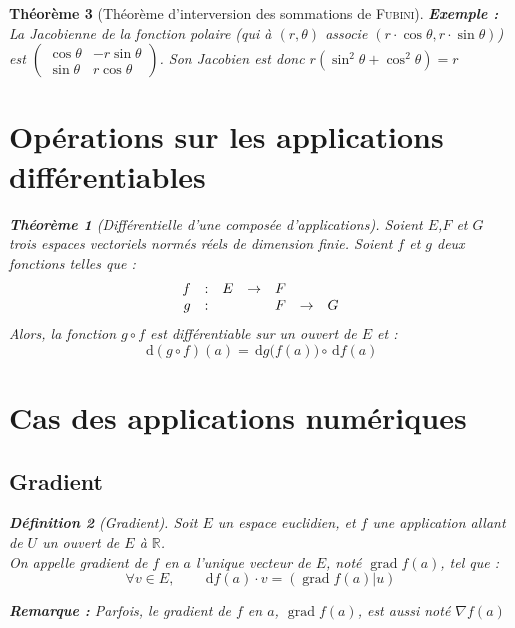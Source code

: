 \documentclass[11pt,a4paper]{report}
\newtheorem{theorem}{Théorème}[chapter]
\newtheorem{itheorem}[theorem]{Théorème}
\theoremstyle{definition}
\newtheorem{dfn}[theorem]{Définition}
\begin{document}
\begin{theorem}[Théorème d'interversion des sommations de \textsc{Fubini}]
{{\textbf{Exemple :} La Jacobienne de la fonction polaire (qui à $(r,\theta )$ associe $(r\cdot \cos{\theta} , r\cdot \sin{\theta} )$) est $\begin{pmatrix}
\cos{\theta} & -r\sin{\theta} \\
\sin{\theta} & r\cos{\theta}
\end{pmatrix}$. Son Jacobien est donc $r\left( \sin^2{\theta} + \cos^2{\theta} \right)=r$


\section{Opérations sur les applications différentiables} %
\label{sec:operations_sur_les_applications_differentiables}
\begin{itheorem}[Différentielle d'une composée d'applications]
Soient $E$,$F$ et $G$ trois espaces vectoriels \emph{normés} \emph{réels} de \emph{dimension finie}.\newline
Soient $f$ et $g$ deux fonctions telles que :
\[
    \begin{array}{r c l c l c l}
    f &:& E &\to& F \\
    g &:& & & F & \to & G 
    \end{array}
\]
Alors, la fonction $g \circ f$ est différentiable sur un ouvert de $E$ et :
     \begin{equation}
     \,\mathrm{d} (g\circ f)(a) = \,\mathrm{d} g\big( f(a)\big) \circ \,\mathrm{d} f(a)
     \end{equation}
     
\end{itheorem}

\section{Cas des applications numériques} %
\label{sec:cas_des_applications_numeriques}
\subsection{Gradient} %
\label{sub:gradient}
\begin{dfn}[Gradient]
     Soit $E$ un espace euclidien, et $f$ une application allant de $U$ un ouvert de $E$ à $\ensuremath{\mathbb{R}}$. \\
     On appelle \emph{gradient} de $f$ en $a$ l'unique vecteur de $E$, noté $\operatorname{grad} f(a)$, tel que :
     \begin{equation}
     \forall v\in E,\qquad \,\mathrm{d} f(a)\cdot v = \left( \operatorname{grad} f(a) | u \right) 
     \end{equation}
\end{dfn}
\textbf{Remarque :} Parfois, le gradient de $f$ en $a$, $\operatorname{grad} f(a)$, est aussi noté $\nabla f(a)$

}}
\end{theorem}
\end{document}
